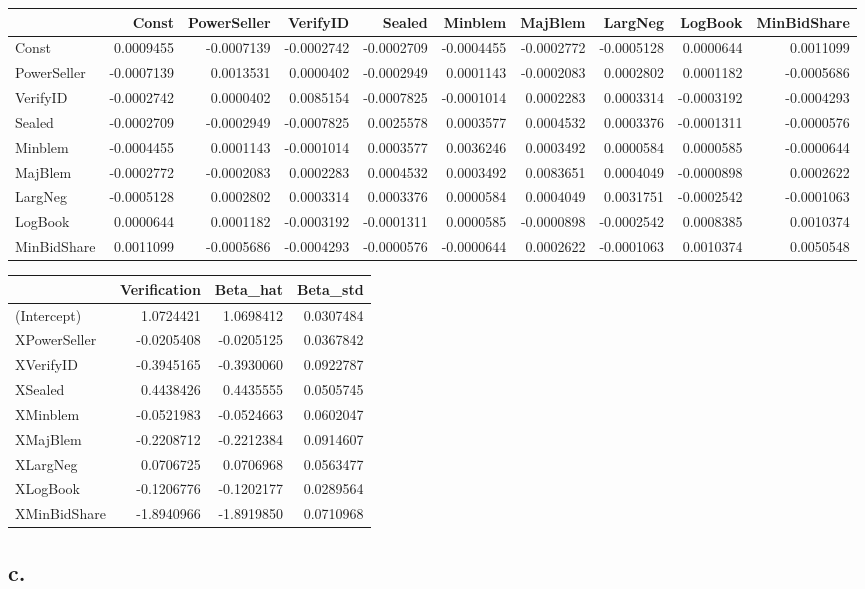 \documentclass[]{article}
\begin{document}
\begin{longtable}[]{@{}lrrrrrrrrr@{}}
\toprule
& Const & PowerSeller & VerifyID & Sealed & Minblem & MajBlem & LargNeg
& LogBook & MinBidShare\tabularnewline
\midrule
\endhead
Const & 0.0009455 & -0.0007139 & -0.0002742 & -0.0002709 & -0.0004455 &
-0.0002772 & -0.0005128 & 0.0000644 & 0.0011099\tabularnewline
PowerSeller & -0.0007139 & 0.0013531 & 0.0000402 & -0.0002949 &
0.0001143 & -0.0002083 & 0.0002802 & 0.0001182 &
-0.0005686\tabularnewline
VerifyID & -0.0002742 & 0.0000402 & 0.0085154 & -0.0007825 & -0.0001014
& 0.0002283 & 0.0003314 & -0.0003192 & -0.0004293\tabularnewline
Sealed & -0.0002709 & -0.0002949 & -0.0007825 & 0.0025578 & 0.0003577 &
0.0004532 & 0.0003376 & -0.0001311 & -0.0000576\tabularnewline
Minblem & -0.0004455 & 0.0001143 & -0.0001014 & 0.0003577 & 0.0036246 &
0.0003492 & 0.0000584 & 0.0000585 & -0.0000644\tabularnewline
MajBlem & -0.0002772 & -0.0002083 & 0.0002283 & 0.0004532 & 0.0003492 &
0.0083651 & 0.0004049 & -0.0000898 & 0.0002622\tabularnewline
LargNeg & -0.0005128 & 0.0002802 & 0.0003314 & 0.0003376 & 0.0000584 &
0.0004049 & 0.0031751 & -0.0002542 & -0.0001063\tabularnewline
LogBook & 0.0000644 & 0.0001182 & -0.0003192 & -0.0001311 & 0.0000585 &
-0.0000898 & -0.0002542 & 0.0008385 & 0.0010374\tabularnewline
MinBidShare & 0.0011099 & -0.0005686 & -0.0004293 & -0.0000576 &
-0.0000644 & 0.0002622 & -0.0001063 & 0.0010374 &
0.0050548\tabularnewline
\bottomrule
\end{longtable}

\begin{longtable}[]{@{}lrrr@{}}
\toprule
& Verification & Beta\_hat & Beta\_std\tabularnewline
\midrule
\endhead
(Intercept) & 1.0724421 & 1.0698412 & 0.0307484\tabularnewline
XPowerSeller & -0.0205408 & -0.0205125 & 0.0367842\tabularnewline
XVerifyID & -0.3945165 & -0.3930060 & 0.0922787\tabularnewline
XSealed & 0.4438426 & 0.4435555 & 0.0505745\tabularnewline
XMinblem & -0.0521983 & -0.0524663 & 0.0602047\tabularnewline
XMajBlem & -0.2208712 & -0.2212384 & 0.0914607\tabularnewline
XLargNeg & 0.0706725 & 0.0706968 & 0.0563477\tabularnewline
XLogBook & -0.1206776 & -0.1202177 & 0.0289564\tabularnewline
XMinBidShare & -1.8940966 & -1.8919850 & 0.0710968\tabularnewline
\bottomrule
\end{longtable}

\hypertarget{c.}{%
\subsection{c.~}\label{c.}}
\end{document}
